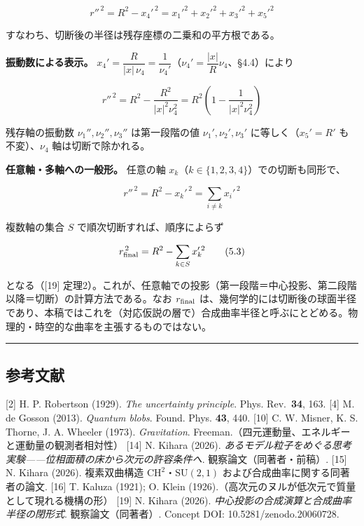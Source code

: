 \documentclass[
]{ltjsarticle}
\begin{document}
\[r''^{\,2}=R^2-x_4'^{\,2}=x_1'^2+x_2'^2+x_3'^2+x_5'^2 \tag{5.2}\]

すなわち、切断後の半径は残存座標の二乗和の平方根である。

\textbf{振動数による表示。}
\(x_4'=\dfrac{R}{|x|\,\nu_4}=\dfrac{1}{\nu_4'}\)（\(\nu_4'=\dfrac{|x|}{R}\nu_4\)、§4.4）により

\[r''^{\,2}=R^2-\frac{R^2}{|x|^2\nu_4^2}=R^2\left(1-\frac{1}{|x|^2\nu_4^2}\right)\]

残存軸の振動数 \(\nu_1'',\nu_2'',\nu_3''\) は第一段階の値
\(\nu_1',\nu_2',\nu_3'\) に等しく（\(x_5'=R'\) も不変）、\(\nu_4\)
軸は切断で除かれる。

\textbf{任意軸・多軸への一般形。} 任意の軸
\(x_k\)（\(k\in\{1,2,3,4\}\)）での切断も同形で、

\[r''^{\,2}=R^2-x_k'^{\,2}=\sum_{i\neq k}x_i'^{\,2}\]

複数軸の集合 \(S\) で順次切断すれば、順序によらず

\[r_{\rm final}^{\,2}=R^2-\sum_{k\in S}x_k'^{\,2} \tag{5.3}\]

となる（{[}19{]}
定理2）。これが、任意軸での投影（第一段階＝中心投影、第二段階以降＝切断）の計算方法である。なお
\(r_{\rm final}\)
は、幾何学的には切断後の球面半径であり、本稿ではこれを（対応仮説の層で）合成曲率半径と呼ぶにとどめる。物理的・時空的な曲率を主張するものではない。

\begin{center}\rule{0.5\linewidth}{0.5pt}\end{center}

\subsection{参考文献}\label{ux53c2ux8003ux6587ux732e}

{[}2{]} H. P. Robertson (1929). \emph{The uncertainty principle}. Phys.
Rev.~\textbf{34}, 163. {[}4{]} M. de Gosson (2013). \emph{Quantum
blobs}. Found. Phys. \textbf{43}, 440. {[}10{]} C. W. Misner, K. S.
Thorne, J. A. Wheeler (1973). \emph{Gravitation}.
Freeman.（四元運動量、エネルギーと運動量の観測者相対性） {[}14{]} N.
Kihara (2026).
\emph{あるモデル粒子をめぐる思考実験------位相面積の床から次元の許容条件へ}.
観察論文（同著者・前稿）. {[}15{]} N. Kihara (2026). 複素双曲構造
\(\mathrm{CH}^2\)・\(\mathrm{SU}(2,1)\)
および合成曲率に関する同著者の論文. {[}16{]} T. Kaluza (1921); O. Klein
(1926).（高次元のヌルが低次元で質量として現れる機構の形） {[}19{]} N.
Kihara (2026). \emph{中心投影の合成演算と合成曲率半径の閉形式}.
観察論文（同著者）. Concept DOI: 10.5281/zenodo.20060728.
\end{document}
